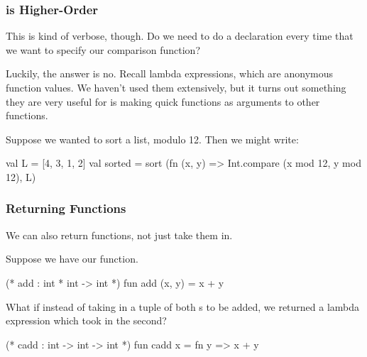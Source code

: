 \documentclass[aspectratio=169, handout]{beamer}
\begin{document}
\begin{frame}[fragile]
  \frametitle{ is Higher-Order}

  This is kind of verbose, though. Do we need to do a  declaration every
  time that we want to specify our comparison function?

  \pause
  \vspace{\fill}

  Luckily, the answer is no. Recall lambda expressions, which are anonymous function
  values. We haven't used them extensively, but it turns out something they are very
  useful for is making quick functions as arguments to other functions.

  \pause
  \vspace{\fill}

  Suppose we wanted to sort a list, modulo 12. Then we might write:

  \pause
  \begin{codeblock}
    val L = [4, 3, 1, 2]
    val sorted = 
      sort (fn (x, y) => Int.compare (x mod 12,  y mod 12), L)
  \end{codeblock}
\end{frame}

\begin{frame}[fragile]
  \frametitle{Returning Functions}

  We can also return functions, not just take them in. 

  \pause
  \vspace{\fill}


  \pause
  Suppose we have our  function.

  \begin{codeblock}
    (* add : int * int -> int *)
    fun add (x, y) = x + y
  \end{codeblock}

  \pause
  \vspace{\fill}

  What if instead of taking in a tuple of both s to be added,
  we returned a lambda expression which took in the second?

  \pause
  \begin{codeblock}
    (* cadd : int -> int -> int *)
    fun cadd x = fn y => x + y
  \end{codeblock}

  \pause
  \vspace{\fill}

\end{frame}
\end{document}

